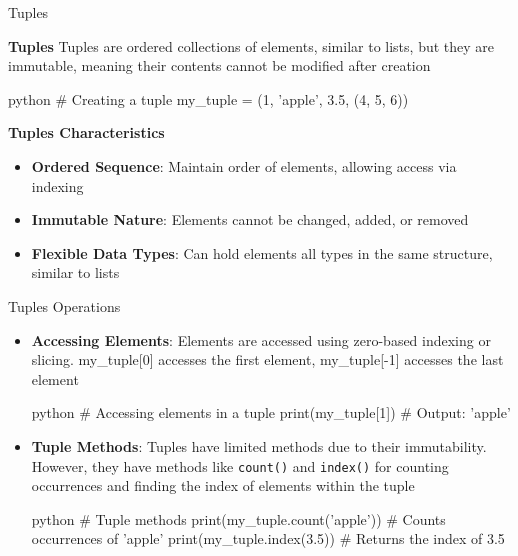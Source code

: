 \documentclass[
	11pt, 
]{beamer}
\begin{document}
\begin{frame}[fragile]{Tuples}
\small
    
\begin{block}{\textbf{Tuples}}
 Tuples are ordered collections of elements, similar to lists, but they are immutable, meaning their contents cannot be modified after creation
\end{block}
\smallskip
\begin{mintedbox}{python}
# Creating a tuple
my_tuple = (1, 'apple', 3.5, (4, 5, 6))
\end{mintedbox}

\begin{exampleblock}{\textbf{Tuples Characteristics}}
    \begin{itemize}
        \item \textbf{Ordered Sequence}: Maintain order of elements, allowing access via indexing
        \item \textbf{Immutable Nature}: Elements cannot be changed, added, or removed
        \item \textbf{Flexible Data Types}: Can hold elements all types in the same structure, similar to lists
    \end{itemize}    
\end{exampleblock}

\end{frame}


\begin{frame}[fragile]{Tuples Operations}
\small
\begin{itemize}
    \item \textbf{Accessing Elements}: Elements are accessed using zero-based indexing or slicing. my\_tuple[0] accesses the first element, my\_tuple[-1] accesses the last element

    \begin{mintedbox}{python}
# Accessing elements in a tuple
print(my_tuple[1])  # Output: 'apple'
    \end{mintedbox}

    \item \textbf{Tuple Methods}: Tuples have limited methods due to their immutability. However, they have methods like \texttt{count()} and \texttt{index()} for counting occurrences and finding the index of elements within the tuple

    \begin{mintedbox}{python}
# Tuple methods
print(my_tuple.count('apple'))  # Counts occurrences of 'apple' 
print(my_tuple.index(3.5))  # Returns the index of 3.5 
    \end{mintedbox}
    
\end{itemize}
\end{frame}
\end{document}
